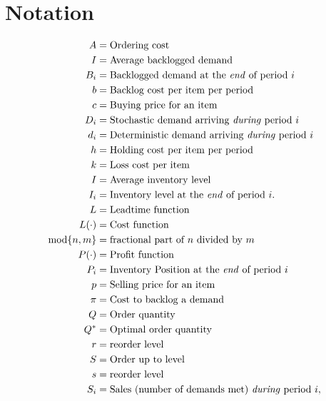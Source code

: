 \section*{Notation}

\begin{align*}
  A &= \text{Ordering cost} \\
  I &= \text{Average backlogged demand} \\
  B_i &= \text{Backlogged demand at the \emph{end} of period $i$} \\
  b &= \text{Backlog cost per item per period} \\
  c &= \text{Buying price for an item} \\
  D_i &= \text{Stochastic  demand arriving \emph{during} period $i$} \\
  d_i &= \text{Deterministic demand arriving \emph{during} period $i$} \\
  h &= \text{Holding cost per item per period} \\
  k &= \text{Loss cost per item} \\
  I &= \text{Average inventory level} \\
  I_i &= \text{Inventory level at the \emph{end} of period $i$.} \\
  L &= \text{Leadtime function} \\
  L(\cdot) &= \text{Cost function} \\
\text{mod}\{n, m\} &=\text{fractional part of $n$ divided by $m$} \\
  P(\cdot) &= \text{Profit function} \\
  P_i &= \text{Inventory Position at the \emph{end} of period $i$} \\
  p &= \text{Selling price for an item} \\
  \pi &= \text{Cost to backlog a demand} \\
  Q &= \text{Order quantity} \\
  Q^* &= \text{Optimal order quantity} \\
  r &= \text{reorder level} \\
  S &= \text{Order up to level} \\
  s &= \text{reorder level} \\
  S_i &= \text{Sales (number of demands met) \emph{during}  period  $i$}, \\
\end{align*}

\clearpage
